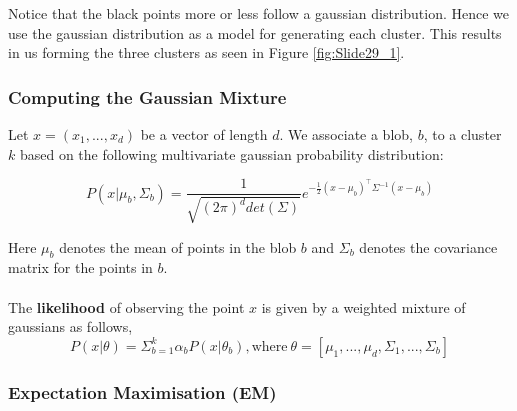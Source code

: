 \documentclass{article}
\begin{document}
\noindent Notice that the black points more or less follow a gaussian distribution. Hence we use the gaussian distribution as a model for generating each cluster. This results in us forming the three clusters as seen in Figure \ref{fig:Slide29_1}.

\subsubsection*{Computing the Gaussian Mixture}

Let $x = (x_1, ..., x_d)$ be a vector of length $d$. We associate a blob, $b$, to a cluster $k$ based on the following multivariate gaussian probability distribution:

\begin{equation}
P(x \vert \mu_b, \Sigma_b) = \frac{1}{\sqrt{(2\pi)^{d}det(\Sigma)}}e^{ -\frac{1}{2}(x - \mu_b)^{\top}\Sigma^{-1}(x - \mu_b)}
\end{equation}

\noindent Here $\mu_b$ denotes the mean of points in the blob $b$ and $\Sigma_b$ denotes the covariance matrix for the points in $b$.
\\\\
The \textbf{likelihood} of observing the point $x$ is given by a weighted mixture of gaussians as follows,
\begin{equation}
P(x \vert \theta) = \Sigma_{b=1}^k \alpha_{b}P(x \vert \theta_b), \text{where} \: \theta = [\mu_1, ..., \mu_d, \Sigma_1, ..., \Sigma_b]
\end{equation}

\subsubsection{Expectation Maximisation (EM)}
\end{document}
